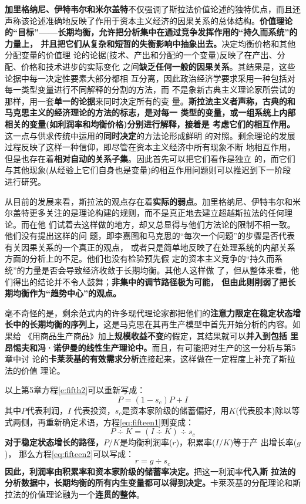 \textbf{加里格纳尼、伊特韦尔和米尔盖特}不仅强调了斯拉法价值论述的独特优点，而且还
声称该论述准确地反映了作用于资本主义经济的因果关系的总体结构。\textbf{价值理论
  的“目标”——长期均衡，允许把分析集中在通过竞争发挥作用的“持久而系统”的力量上，
  并且把它们从复杂和短暂的失衡影响中抽象出去。}决定均衡价格和其他分配变量的价值理
论的论据(技术、产出和分配的一个变量)反映了在产出、分配、价格和技术进步的实际变化
之间\textbf{缺乏任何一般的因果关系}。其结果是，这些论据中每一决定性要素大部分都相
互分离，因此政治经济学要求采用一种包括对每一类型变量进行不同解释的分割的方法，而
不是象新古典主义理论家所尝试的那样，用一套\textbf{单一的论据}来同时决定所有的变
量。\textbf{斯拉法主义者声称，古典的和马克思主义的经济理论的方法的标志，是对每一
  类型的变量，或一组系统上内部相关的变量(如利润率和均衡价格)分别进行解释，接着是
  考虑它们的相互作用。}这一点与供求传统中运用的\textbf{同时决定}的方法论形成鲜明
的对照。剩余理论的发展过程反映了这样一种信仰，即尽管在资本主义经济中所有现象不断
地相互作用，但是也存在着\textbf{相对自动的关系子集}。因此首先可以把它们看作是独立
的，而它们与其他现象(从经验上它们自身也是变量)的相互作用问题则可以推迟到下一阶段
进行研究。

从目前的发展来看，斯拉法的观点存在着\textbf{实际的弱点}。加里格纳尼、伊特韦尔和米
尔盖特更多关注的是理论构建的规则，而不是真正地去建立超越斯拉法的任何理论。而在他
们试着去这样做的地方，却又总显得与他们方法论的限制不相一致。他们没有提出这样的问
题，即李嘉图和马克思的“每次一个问题”的步骤是否代表有关因果关系的一个真正的观点，
或者只是简单地反映了在处理系统的内部关系方面的分析上的不足。他们也没有检验预先假
定的资本主义竞争的“持久而系统”的力量是否会导致经济收敛于长期均衡。其他人这样做
了，但从整体来看，他们得出的结论并不令人鼓舞；\textbf{非集中的调节路径极为可能，
  但由此则削弱了把长期均衡作为“趋势中心”的观点。}

毫不奇怪的是，剩余范式内的许多现代理论家都把他们的\textbf{注意力限定在稳定状态增
  长中的长期均衡的序列上，}这是马克思在其再生产模型中首先开始分析的内容。如果给
《用商品生产商品》加上\textbf{规模收益不变}的假定，其结果就可以\textbf{并入到包括
  里昂惕夫和冯·诺伊曼的线性生产理论中。}而且，有可能把对生产的这一分析与第5章中讨
论的\textbf{卡莱茨基的有效需求分析}连接起来，这样做在一定程度上补充了斯拉法的价值
理论。

以上第5章方程\eqref{e:fifth2}可以重新写成：
\begin{equation}
P=(1-s_c)P+ I  \label{eq:fifteen1}
\end{equation}
其中$P$代表利润，$I$ 代表投资，$s_c$是资本家阶级的储蓄偏好，用$K$(代表股本)除以等
式两侧，再重新确定术语，方程\eqref{eq:fifteen1}则变成：
\begin{equation}
  \label{eq:fifteen2}
P \div K=(I \div K) \div s_c
\end{equation}
\textbf{对于稳定状态增长的路径，}$P / K$是均衡利润率($r$)，积累率($ I / K$)等于产
出增长率($g$)， 那么方程\eqref{eq:fifteen2}可以写成：
\begin{equation}
  \label{eq:fifteen3}
r=g \div s_c
\end{equation}
\textbf{因此，利润率由积累率和资本家阶级的储蓄率决定。}把这一利润率\textbf{代入斯
  拉法的分析数据中，长期均衡的所有内生变量都可以得到决定。}卡莱茨基的分配理论和斯
拉法的价值理论融为一个\textbf{连贯的整体}。


